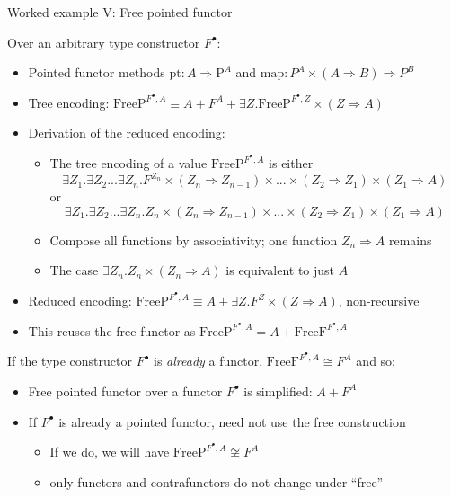\documentclass[english,,russian]{beamer}
\begin{document}
\begin{frame}{Worked example V: Free pointed functor}

Over an arbitrary type constructor $F^{\bullet}$:
\begin{itemize}
\item Pointed functor methods {\footnotesize{}$\text{pt}:A\Rightarrow\text{P}^{A}$}
and {\footnotesize{}$\text{map}:P^{A}\times\left(A\Rightarrow B\right)\Rightarrow P^{B}$}{\footnotesize\par}
\item Tree encoding: {\footnotesize{}$\text{FreeP}^{F^{\bullet},A}\equiv A+F^{A}+\exists Z.\text{FreeP}^{F^{\bullet},Z}\times\left(Z\Rightarrow A\right)$}{\footnotesize\par}
\item Derivation of the reduced encoding:
\begin{itemize}
\item The tree encoding of a value $\text{FreeP}^{F^{\bullet},A}$ is either{\footnotesize{}
\[
\exists Z_{1}.\exists Z_{2}...\exists Z_{n}.F^{Z_{n}}\times\left(Z_{n}\Rightarrow Z_{n-1}\right)\times...\times\left(Z_{2}\Rightarrow Z_{1}\right)\times\left(Z_{1}\Rightarrow A\right)
\]
}or{\footnotesize{}
\[
\exists Z_{1}.\exists Z_{2}...\exists Z_{n}.Z_{n}\times\left(Z_{n}\Rightarrow Z_{n-1}\right)\times...\times\left(Z_{2}\Rightarrow Z_{1}\right)\times\left(Z_{1}\Rightarrow A\right)
\]
}{\footnotesize\par}
\item Compose all functions by associativity; one function $Z_{n}\Rightarrow A$
remains
\item The case $\exists Z_{n}.Z_{n}\times\left(Z_{n}\Rightarrow A\right)$
is equivalent to just $A$
\end{itemize}
\item Reduced encoding: {\footnotesize{}$\text{FreeP}^{F^{\bullet},A}\equiv A+\exists Z.F^{Z}\times\left(Z\Rightarrow A\right)$,
}non-recursive
\item This reuses the free functor as $\text{FreeP}^{F^{\bullet},A}=A+\text{FreeF}^{F^{\bullet},A}$
\end{itemize}
If the type constructor $F^{\bullet}$ is \emph{already} a functor,
$\text{FreeF}^{F^{\bullet},A}\cong F^{A}$ and so:
\begin{itemize}
\item Free pointed functor over a functor $F^{\bullet}$ is simplified:
$A+F^{A}$
\item If $F^{\bullet}$ is already a pointed functor, need not use the free
construction
\begin{itemize}
\item If we do, we will have $\text{FreeP}^{F^{\bullet},A}\not\cong F^{A}$ 
\item only functors and contrafunctors do not change under ``free''
\end{itemize}
\end{itemize}
\end{frame}
\end{document}
